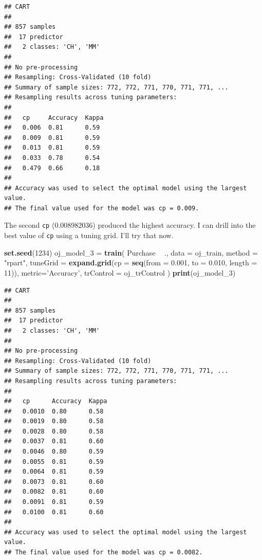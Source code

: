 \documentclass[
]{book}
\newenvironment{Shaded}{\begin{snugshade}}{\end{snugshade}}
\newcommand{\DataTypeTok}[1]{\textcolor[rgb]{0.13,0.29,0.53}{#1}}
\newcommand{\DecValTok}[1]{\textcolor[rgb]{0.00,0.00,0.81}{#1}}
\newcommand{\FloatTok}[1]{\textcolor[rgb]{0.00,0.00,0.81}{#1}}
\newcommand{\KeywordTok}[1]{\textcolor[rgb]{0.13,0.29,0.53}{\textbf{#1}}}
\newcommand{\NormalTok}[1]{#1}
\newcommand{\OperatorTok}[1]{\textcolor[rgb]{0.81,0.36,0.00}{\textbf{#1}}}
\newcommand{\StringTok}[1]{\textcolor[rgb]{0.31,0.60,0.02}{#1}}
\begin{document}
\begin{verbatim}
## CART 
## 
## 857 samples
##  17 predictor
##   2 classes: 'CH', 'MM' 
## 
## No pre-processing
## Resampling: Cross-Validated (10 fold) 
## Summary of sample sizes: 772, 772, 771, 770, 771, 771, ... 
## Resampling results across tuning parameters:
## 
##   cp     Accuracy  Kappa
##   0.006  0.81      0.59 
##   0.009  0.81      0.59 
##   0.013  0.81      0.59 
##   0.033  0.78      0.54 
##   0.479  0.66      0.18 
## 
## Accuracy was used to select the optimal model using the largest value.
## The final value used for the model was cp = 0.009.
\end{verbatim}

The second \texttt{cp} (0.008982036) produced the highest accuracy. I can drill into the best value of \texttt{cp} using a tuning grid. I'll try that now.

\begin{Shaded}
\begin{Highlighting}[]
\KeywordTok{set.seed}\NormalTok{(}\DecValTok{1234}\NormalTok{)}
\NormalTok{oj_model_}\DecValTok{3}\NormalTok{ =}\StringTok{ }\KeywordTok{train}\NormalTok{(}
\NormalTok{   Purchase }\OperatorTok{~}\StringTok{ }\NormalTok{., }
   \DataTypeTok{data =}\NormalTok{ oj_train, }
   \DataTypeTok{method =} \StringTok{"rpart"}\NormalTok{,}
   \DataTypeTok{tuneGrid =} \KeywordTok{expand.grid}\NormalTok{(}\DataTypeTok{cp =} \KeywordTok{seq}\NormalTok{(}\DataTypeTok{from =} \FloatTok{0.001}\NormalTok{, }\DataTypeTok{to =} \FloatTok{0.010}\NormalTok{, }\DataTypeTok{length =} \DecValTok{11}\NormalTok{)),  }
   \DataTypeTok{metric=}\StringTok{'Accuracy'}\NormalTok{,}
   \DataTypeTok{trControl =}\NormalTok{ oj_trControl}
\NormalTok{   )}
\KeywordTok{print}\NormalTok{(oj_model_}\DecValTok{3}\NormalTok{)}
\end{Highlighting}
\end{Shaded}

\begin{verbatim}
## CART 
## 
## 857 samples
##  17 predictor
##   2 classes: 'CH', 'MM' 
## 
## No pre-processing
## Resampling: Cross-Validated (10 fold) 
## Summary of sample sizes: 772, 772, 771, 770, 771, 771, ... 
## Resampling results across tuning parameters:
## 
##   cp      Accuracy  Kappa
##   0.0010  0.80      0.58 
##   0.0019  0.80      0.58 
##   0.0028  0.80      0.58 
##   0.0037  0.81      0.60 
##   0.0046  0.80      0.59 
##   0.0055  0.81      0.59 
##   0.0064  0.81      0.59 
##   0.0073  0.81      0.60 
##   0.0082  0.81      0.60 
##   0.0091  0.81      0.59 
##   0.0100  0.81      0.60 
## 
## Accuracy was used to select the optimal model using the largest value.
## The final value used for the model was cp = 0.0082.
\end{verbatim}
\end{document}
